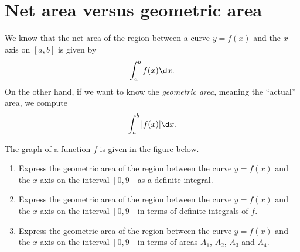 \documentclass{ximera}
\begin{document}
\section{Net area versus geometric area}


We know that the net area of the region between a curve $y=f(x)$ and the $x$-axis
on $[a,b]$ is given by
\[
\int_a^b f(x) \d x.
\]
On the other hand, if we want to know the \textit{geometric area},
meaning the ``actual'' area, we compute
\[
\int_a^b |f(x)| \d x.
\]
\begin{example}
The graph of a function $f$ is given in the figure below.
 \begin{image}
\end{image}
\begin{enumerate}
\item Express the  geometric  area of the region between the curve $y=f(x)$ and the $x$-axis on the interval $[0,9]$ as a definite integral.
\item Express the  geometric  area of the region between the curve $y=f(x)$ and the $x$-axis on the interval $[0,9]$ in terms of  definite integrals of $f$.
\item Express the  geometric  area of the region between the curve $y=f(x)$ and the $x$-axis on the interval $[0,9]$ in terms of areas $A_1$, $A_2$, $A_3$ and $A_4$.


\end{enumerate}
\end{example}
\end{document}
